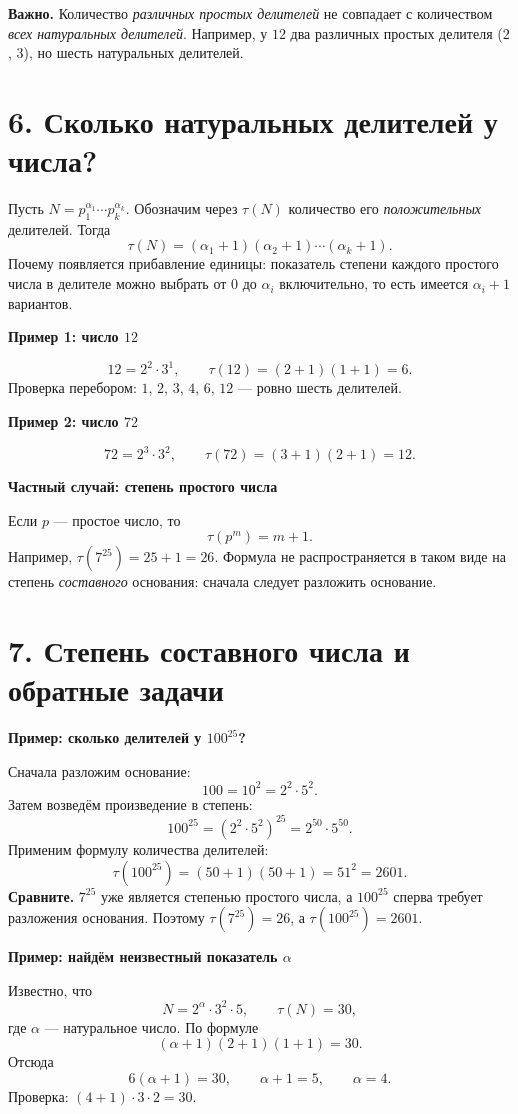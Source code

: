\documentclass[a4paper,12pt]{article}
\newcommand{\important}[1]{\textcolor{deepaccent}{\textbf{#1}}}
\newcommand{\method}[1]{\medskip\noindent\textcolor{deepaccent}{\textbf{#1}}\quad}
\newcommand{\sectiontitle}[1]{\needspace{5\baselineskip}\section*{\color{deepaccent}#1}}
\newcommand{\subtopic}[1]{\medskip\textbf{\color{accent}#1}\par\vspace{-2pt}}
\begin{document}
\method{Важно.} Количество \emph{различных простых делителей} не совпадает с количеством \emph{всех натуральных делителей}. Например, у $12$ два различных простых делителя ($2$, $3$), но шесть натуральных делителей.

\sectiontitle{6. Сколько натуральных делителей у числа?}
Пусть $N=p_1^{\alpha_1}\cdots p_k^{\alpha_k}$. Обозначим через $\tau(N)$ количество его \emph{положительных} делителей. Тогда
\[
\boxed{\tau(N)=(\alpha_1+1)(\alpha_2+1)\cdots(\alpha_k+1).}
\]
Почему появляется прибавление единицы: показатель степени каждого простого числа в делителе можно выбрать от $0$ до $\alpha_i$ включительно, то есть имеется $\alpha_i+1$ вариантов.

\subtopic{Пример 1: число $12$}
\[
12=2^2\cdot3^1,\qquad\tau(12)=(2+1)(1+1)=\boxed{6}.
\]
Проверка перебором: $1$, $2$, $3$, $4$, $6$, $12$ --- ровно шесть делителей.

\subtopic{Пример 2: число $72$}
\[
72=2^3\cdot3^2,\qquad\tau(72)=(3+1)(2+1)=\boxed{12}.
\]

\subtopic{Частный случай: степень простого числа}
Если $p$ --- простое число, то
\[
\boxed{\tau(p^m)=m+1.}
\]
Например, $\tau(7^{25})=25+1=\boxed{26}$. Формула не распространяется в таком виде на степень \emph{составного} основания: сначала следует разложить основание.
\clearpage

\begingroup{}\setlength{\parskip}{2pt}
\sectiontitle{7. Степень составного числа и обратные задачи}
\subtopic{Пример: сколько делителей у $100^{25}$?}
Сначала разложим основание:
\[
100=10^2=2^2\cdot5^2.
\]
Затем возведём произведение в степень:
\[
100^{25}=(2^2\cdot5^2)^{25}=2^{50}\cdot5^{50}.
\]
Применим формулу количества делителей:
\[
\boxed{\tau(100^{25})=(50+1)(50+1)=51^2=2601.}
\]
\important{Сравните.} $7^{25}$ уже является степенью простого числа, а $100^{25}$ сперва требует разложения основания. Поэтому $\tau(7^{25})=26$, а $\tau(100^{25})=2601$.

\subtopic{Пример: найдём неизвестный показатель $\alpha$}
Известно, что
\[
N=2^{\alpha}\cdot3^2\cdot5,\qquad\tau(N)=30,
\]
где $\alpha$ --- натуральное число. По формуле
\[
(\alpha+1)(2+1)(1+1)=30.
\]
Отсюда
\[
6(\alpha+1)=30,\qquad \alpha+1=5,\qquad\boxed{\alpha=4}.
\]
Проверка: $(4+1)\cdot3\cdot2=30$.
\end{document}
